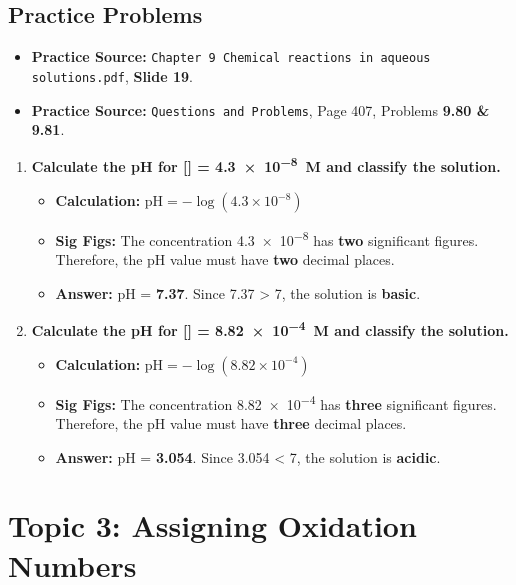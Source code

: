 \documentclass{article}
\begin{document}
\subsection*{Practice Problems}
\begin{itemize}[itemsep=5pt]
    \item \textbf{Practice Source:} \texttt{Chapter 9 Chemical reactions in aqueous solutions.pdf}, \textbf{Slide 19}.
    \item \textbf{Practice Source:} \texttt{Questions and Problems}, Page 407, Problems \textbf{9.80 \& 9.81}.
\end{itemize}
\begin{enumerate}[itemsep=5pt]
    \item \textbf{Calculate the pH for [] = \SI{4.3e-8}{M} and classify the solution.}
    \begin{itemize}
        \item \textbf{Calculation:} \( \text{pH} = -\log(4.3 \times 10^{-8}) \)
        \item \textbf{Sig Figs:} The concentration \num{4.3e-8} has \textbf{two} significant figures. Therefore, the pH value must have \textbf{two} decimal places.
        \item \textbf{Answer:} pH = \textbf{7.37}. Since 7.37 > 7, the solution is \textbf{basic}.
    \end{itemize}
    \item \textbf{Calculate the pH for [] = \SI{8.82e-4}{M} and classify the solution.}
    \begin{itemize}
        \item \textbf{Calculation:} \( \text{pH} = -\log(8.82 \times 10^{-4}) \)
        \item \textbf{Sig Figs:} The concentration \num{8.82e-4} has \textbf{three} significant figures. Therefore, the pH value must have \textbf{three} decimal places.
        \item \textbf{Answer:} pH = \textbf{3.054}. Since 3.054 < 7, the solution is \textbf{acidic}.
    \end{itemize}
\end{enumerate}

\section*{Topic 3: Assigning Oxidation Numbers}
\end{document}
